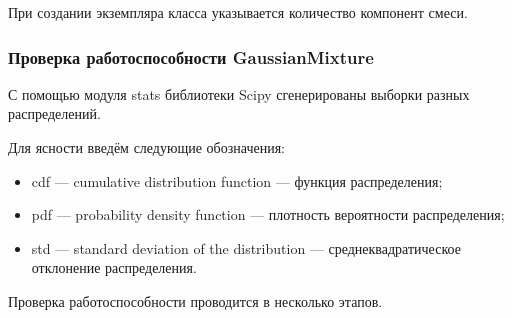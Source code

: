 При создании экземпляра класса указывается количество компонент смеси.

\subsubsection{Проверка работоспособности GaussianMixture}

С помощью модуля stats \cite{seventh} библиотеки Scipy сгенерированы выборки разных распределений.

Для ясности введём следующие обозначения:
\begin{itemize}
    \item cdf --- cumulative distribution function --- функция распределения;
    \item pdf --- probability density function --- плотность вероятности распределения;
    \item std --- standard deviation of the distribution --- среднеквадратическое отклонение распределения.
\end{itemize}

Проверка работоспособности проводится в несколько этапов.

